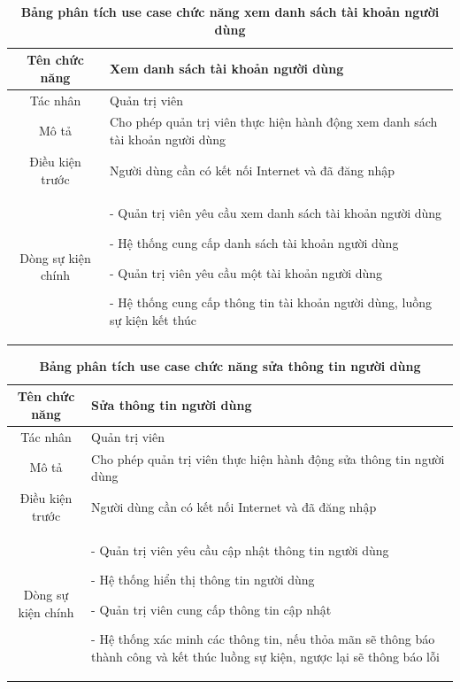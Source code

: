   \begin{table}[H]
    \caption{\bfseries \fontsize{12pt}{0pt}\selectfont Bảng phân tích use case chức năng xem danh sách tài khoản người dùng}
    \centering
    \begin{tabularx}{0.9\textwidth}{|c|X|}
      \hline
      \textbf{Tên chức năng} & \textbf{Xem danh sách tài khoản người dùng} \\
      \hline
      Tác nhân & Quản trị viên \\
      \hline
      Mô tả & Cho phép quản trị viên thực hiện hành động xem danh sách tài khoản người dùng \\
      \hline
      Điều kiện trước & Người dùng cần có kết nối Internet và đã đăng nhập \\
      \hline
      Dòng sự kiện chính & 
        - Quản trị viên yêu cầu xem danh sách tài khoản người dùng
        
        - Hệ thống cung cấp danh sách tài khoản người dùng

        - Quản trị viên yêu cầu một tài khoản người dùng

        - Hệ thống cung cấp thông tin tài khoản người dùng, luồng sự kiện kết thúc         
        \\
      \hline
    \end{tabularx}
  \end{table}

  \begin{table}[H]
    \caption{\bfseries \fontsize{12pt}{0pt}\selectfont Bảng phân tích use case chức năng sửa thông tin người dùng}
    \centering
    \begin{tabularx}{0.9\textwidth}{|c|X|}
      \hline
      \textbf{Tên chức năng} & \textbf{Sửa thông tin người dùng} \\
      \hline
      Tác nhân & Quản trị viên \\
      \hline
      Mô tả & Cho phép quản trị viên thực hiện hành động sửa thông tin người dùng \\
      \hline
      Điều kiện trước & Người dùng cần có kết nối Internet và đã đăng nhập \\
      \hline
      Dòng sự kiện chính & 
        - Quản trị viên yêu cầu cập nhật thông tin người dùng

        - Hệ thống hiển thị thông tin người dùng

        - Quản trị viên cung cấp thông tin cập nhật

        - Hệ thống xác minh các thông tin, nếu thỏa mãn sẽ thông báo thành công và kết thúc luồng sự kiện, ngược lại 
        sẽ thông báo lỗi         
        \\
      \hline
    \end{tabularx}
  \end{table}

